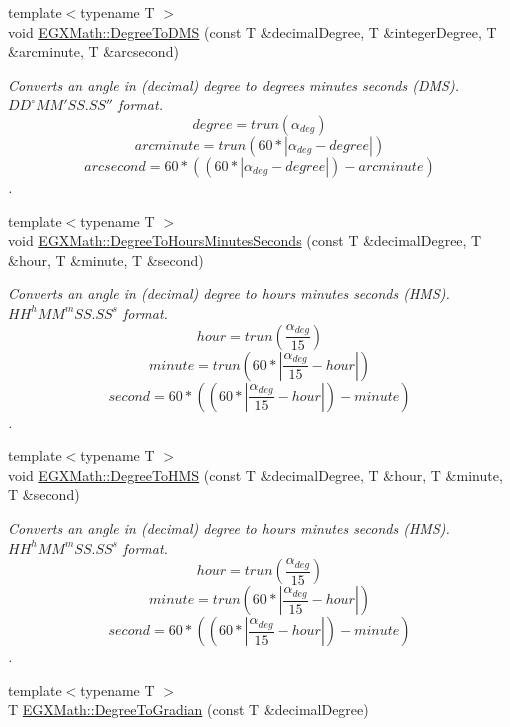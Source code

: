 \begin{DoxyCompactItemize}
{\footnotesize template$<$typename T $>$ }\\void \mbox{\hyperlink{group___e_g_x_math-_conversions-_angle_conversions-_degree_ga1096d04647918e20f61fb184ba2a7dce}{E\+G\+X\+Math\+::\+Degree\+To\+D\+MS}} (const T \&decimal\+Degree, T \&integer\+Degree, T \&arcminute, T \&arcsecond)
\begin{DoxyCompactList}\small\item\em Converts an angle in (decimal) degree to degrees minutes seconds (D\+MS). ${DD}^{\circ}{MM}'{SS.SS}''$ format. \[degree=trun(\alpha_{deg})\] \[arcminute=trun(60 * |\alpha_{deg} - degree|)\] \[arcsecond=60 * ((60 * |\alpha_{deg} - degree|)-arcminute)\]. \end{DoxyCompactList}\item 
{\footnotesize template$<$typename T $>$ }\\void \mbox{\hyperlink{group___e_g_x_math-_conversions-_angle_conversions-_degree_ga770b13da33b6f6c7bfa398cca7f24dbe}{E\+G\+X\+Math\+::\+Degree\+To\+Hours\+Minutes\+Seconds}} (const T \&decimal\+Degree, T \&hour, T \&minute, T \&second)
\begin{DoxyCompactList}\small\item\em Converts an angle in (decimal) degree to hours minutes seconds (H\+MS). ${HH}^{h}{MM}^{m}{SS.SS}^{s}$ format. \[hour=trun(\frac{\alpha_{deg}}{15})\] \[minute=trun(60 * |\frac{\alpha_{deg}}{15} - hour|)\] \[second=60 * ((60 * |\frac{\alpha_{deg}}{15} - hour|)-minute)\]. \end{DoxyCompactList}\item 
{\footnotesize template$<$typename T $>$ }\\void \mbox{\hyperlink{group___e_g_x_math-_conversions-_angle_conversions-_degree_ga0bb223ca6e77b00439a6d910ab32d82e}{E\+G\+X\+Math\+::\+Degree\+To\+H\+MS}} (const T \&decimal\+Degree, T \&hour, T \&minute, T \&second)
\begin{DoxyCompactList}\small\item\em Converts an angle in (decimal) degree to hours minutes seconds (H\+MS). ${HH}^{h}{MM}^{m}{SS.SS}^{s}$ format. \[hour=trun(\frac{\alpha_{deg}}{15})\] \[minute=trun(60 * |\frac{\alpha_{deg}}{15} - hour|)\] \[second=60 * ((60 * |\frac{\alpha_{deg}}{15} - hour|)-minute)\]. \end{DoxyCompactList}\item 
{\footnotesize template$<$typename T $>$ }\\T \mbox{\hyperlink{group___e_g_x_math-_conversions-_angle_conversions-_degree_ga25bb5506b3f66fff7a1b85bf7bd795b3}{E\+G\+X\+Math\+::\+Degree\+To\+Gradian}} (const T \&decimal\+Degree)

\end{DoxyCompactItemize}
